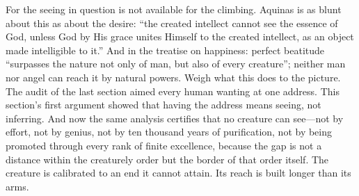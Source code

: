 For the seeing in question is not available for the climbing. Aquinas is as blunt about this as about the desire: ``the created intellect cannot see the essence of God, unless God by His grace unites Himself to the created intellect, as an object made intelligible to it.'' And in the treatise on happiness: perfect beatitude ``surpasses the nature not only of man, but also of every creature''; neither man nor angel can reach it by natural powers. Weigh what this does to the picture. The audit of the last section aimed every human wanting at one address. This section's first argument showed that having the address means seeing, not inferring. And now the same analysis certifies that no creature can see---not by effort, not by genius, not by ten thousand years of purification, not by being promoted through every rank of finite excellence, because the gap is not a distance within the creaturely order but the border of that order itself. The creature is calibrated to an end it cannot attain. Its reach is built longer than its arms.

